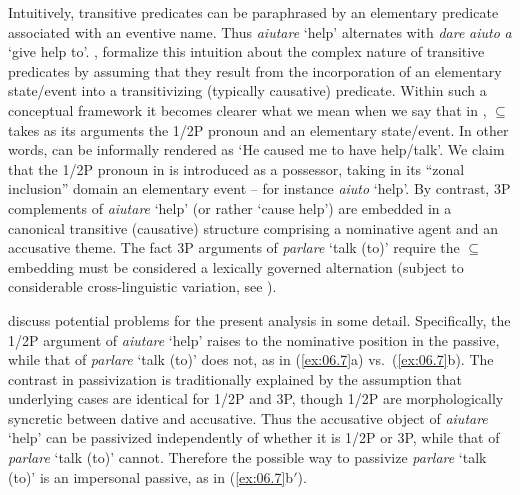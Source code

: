 \documentclass[output=paper]{langsci/langscibook}
\begin{document}
\ea%
    \label{ex:06.6}
\z

Intuitively, transitive predicates can be paraphrased by an elementary
predicate associated with an eventive name. Thus \emph{aiutare} ‘help’
alternates with \emph{dare} \emph{aiuto} \emph{a} ‘give help to’.
\citet{HaleKeyser1993}, \citet{Chomsky1995} formalize this intuition about the
complex nature of transitive predicates by assuming that they result from the
incorporation of an elementary state/event into a transitivizing (typically
causative) predicate. Within such a conceptual framework it becomes clearer
what we mean when we say that in , ${\subseteq}$ takes as its
arguments the 1/2P pronoun and an elementary state/event. In other words,
 can be informally rendered as ‘He caused me to have help/talk’.
We claim that the 1/2P pronoun in  is introduced as a possessor,
taking in its “zonal inclusion” domain an elementary event – for instance
\emph{aiuto} ‘help’. By contrast, 3P complements of \emph{aiutare} ‘help’ (or
rather ‘cause help’) are embedded in a canonical transitive (causative)
structure comprising a nominative agent and an accusative theme. The fact 3P
arguments of \emph{parlare} ‘talk (to)’ require the ${\subseteq}$ embedding
must be considered a lexically governed alternation (subject to considerable
cross-linguistic variation, see \citealt{Svenonius2002}).

\citet{ManFra2016} discuss potential problems for the present analysis
in some detail. Specifically, the 1/2P argument of \emph{aiutare} ‘help’ raises
to the nominative position in the passive, while that of \emph{parlare} ‘talk
(to)’ does not, as in (\ref{ex:06.7}a) vs.\ (\ref{ex:06.7}b). The contrast in
passivization is traditionally explained by the assumption that underlying
cases are identical for 1/2P and 3P, though 1/2P are morphologically syncretic
between dative and accusative. Thus the accusative object of \emph{aiutare}
‘help’ can be passivized independently of whether it is 1/2P or 3P, while that
of \emph{parlare} ‘talk (to)’ cannot. Therefore the possible way to passivize
\emph{parlare} ‘talk (to)’ is an impersonal passive, as in
(\ref{ex:06.7}b$'$).
\end{document}

